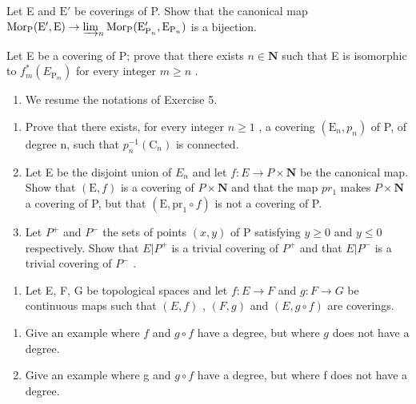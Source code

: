 Let E and \(\mathrm{E}'\) be coverings of P. Show that the canonical map \(\mathrm{Mor}_{\mathrm{P}}(\mathrm{E}',\mathrm{E})\to \varinjlim_{n}\mathrm{Mor}_{\mathrm{P}}(\mathrm{E}_{\mathrm{P}_n}',\mathrm{E}_{\mathrm{P}_n})\) is a bijection.

Let E be a covering of P; prove that there exists \(n \in \mathbf{N}\) such that E is isomorphic to \(f_{m}^{*}(E_{\mathrm{P}_{m}})\) for every integer \(m \geqslant n\) .

\begin{enumerate}
\def\labelenumi{\arabic{enumi})}
\setcounter{enumi}{5}
\tightlist
\item
  We resume the notations of Exercise 5.
\end{enumerate}

\begin{enumerate}
\def\labelenumi{\alph{enumi})}
\item
  Prove that there exists, for every integer \(n \geqslant 1\) , a covering \((\mathrm{E}_{n}, p_{n})\) of P, of degree n, such that \(p_{n}^{-1}(\mathrm{C}_{n})\) is connected.
\item
  Let E be the disjoint union of \(E_{n}\) and let \(f: E \to P \times \mathbf{N}\) be the canonical map. Show that \((\mathrm{E}, f)\) is a covering of \(P \times \mathbf{N}\) and that the map \(pr_{1}\) makes \(P \times \mathbf{N}\) a covering of P, but that \((\mathrm{E}, \mathrm{pr}_{1} \circ f)\) is not a covering of P.
\item
  Let \(P^{+}\) and \(P^{-}\) the sets of points \((x,y)\) of P satisfying \(y \geqslant 0\) and \(y \leqslant 0\) respectively. Show that \(E|P^{+}\) is a trivial covering of \(P^{+}\) and that \(E|P^{-}\) is a trivial covering of \(P^{-}\) .
\end{enumerate}

\begin{enumerate}
\def\labelenumi{\arabic{enumi})}
\setcounter{enumi}{6}
\tightlist
\item
  Let E, F, G be topological spaces and let \(f: E \to F\) and \(g: F \to G\) be continuous maps such that \((E, f)\) , \((F, g)\) and \((E, g \circ f)\) are coverings.
\end{enumerate}

\begin{enumerate}
\def\labelenumi{\alph{enumi})}
\item
  Give an example where \(f\) and \(g \circ f\) have a degree, but where \(g\) does not have a degree.
\item
  Give an example where g and \(g \circ f\) have a degree, but where f does not have a degree.
\end{enumerate}

